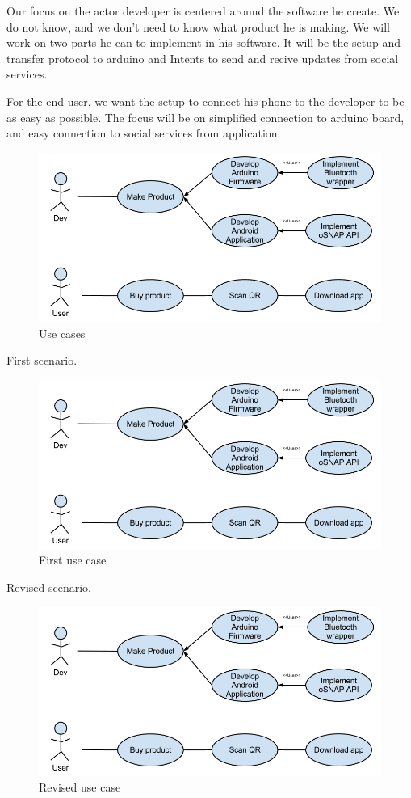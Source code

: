 Our focus on the actor developer is centered around the software he create. We do not know, and we don't need to
know what product he is making. We will work on two parts he can to implement in his software. It will be the setup and
transfer protocol to arduino and Intents to send and recive updates from social services.

For the end user, we want the setup to connect his phone to the developer to be as easy as possible. The focus will be on
simplified connection to arduino board, and easy connection to social services from application.

\begin{figure}[hb!]
\centering \includegraphics[scale=0.50]{img/use-cases.png}
\caption{Use cases}
\label{fig:architecture-usecases}
\end{figure}

First scenario.

\begin{figure}[hb!]
\centering \includegraphics[scale=0.50]{img/use-cases.png}
\caption{First use case}
\label{fig:req-usecase1}
\end{figure}

Revised scenario.

\begin{figure}[hb!]
\centering \includegraphics[scale=0.50]{img/use-cases.png}
\caption{Revised use case}
\label{fig:req-usecase2}
\end{figure}